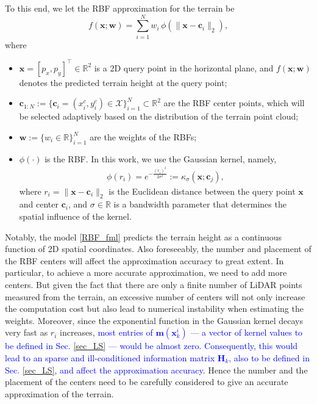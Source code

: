 \documentclass[journal,twoside,web]{ieeecolor}
\newcommand{\cs}[1]{\textcolor{blue}{#1}}
\newcommand{\mR}{\mathbb{R}}
\begin{document}
To this end, we let the RBF approximation for the terrain be
\begin{equation}
    f(\mathbf{x};\mathbf{w}) = \sum_{i=1}^{N} w_i \, \phi(\lVert \mathbf{x} - \mathbf{c}_i \rVert_2),
    \label{RBF_fml}
\end{equation}
where
\begin{itemize}
    \item \( \mathbf{x} =[p_x,p_y]^\top\in \mathbb{R}^2 \) is a 2D query point in the horizontal plane, and \( f(\mathbf{x};\mathbf{w}) \) denotes the predicted terrain height at the query point;
    \item \( \mathbf{c}_{1:N}:=\{ \mathbf{c}_i = (x_i^c, y_i^c)\in\mathcal{X}\}_{i=1}^{N} \subset \mathbb{R}^2 \) are the RBF center points, which will be selected adaptively based on the distribution of the terrain point cloud;
    \item \(\mathbf{w}:= \{w_i \in \mathbb{R}\}_{i=1}^N \) are the weights of the RBFs;
    \item \( \phi(\cdot) \) is the RBF. In this work, we use the Gaussian kernel, namely,
    \begin{align}
        \phi(r_i) = e^{-\frac{(r_i)^2}{2\sigma^2}}:=\kappa_{\sigma}(\mathbf{x};\mathbf{c}_j),\label{eq:RBF_def}
    \end{align}
    where \( r_i = \lVert \mathbf{x} - \mathbf{c}_i \rVert_2 \) is the Euclidean distance between the query point $\mathbf{x}$ and center $\mathbf{c}_i$, and \( \sigma\in \mR\) is a bandwidth parameter that determines the spatial influence of the kernel.
\end{itemize}
\iffalse
Notably, the model \eqref{RBF_fml} predicts the terrain height as a continuous function of 2D spatial coordinates.
Also foreseeably, the number and placement of the RBF centers will affect the approximation accuracy to great extent.
In particular, to achieve a more accurate approximation, we need to add more centers. But given the fact that there are only a finite number of LiDAR points measured from the terrain, an excessive number of centers will not only increase the computation cost but also lead to numerical instability when estimating the weights.
Moreover, since the exponential function in the Gaussian kernel decays very fast as $r_i$ increases, \cs{most entries of $\mathbf{m}(\mathbf{x}_k^i)$ — a vector of kernel values to be defined in Sec. \ref{sec_LS} — would be almost zero. Consequently, this would lead to an sparse and ill-conditioned information matrix $\mathbf{H}_k$, also to be defined in Sec. \ref{sec_LS}, and affect the approximation accuracy.} Hence the number and the placement of the centers need to be carefully considered to give an accurate approximation of the terrain.
\end{document}
